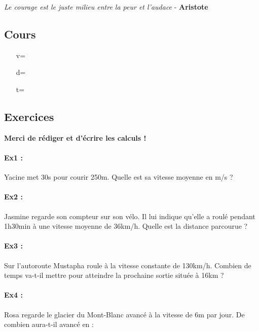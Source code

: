\begin{center}
  \textit{Le courage est le juste milieu entre la peur et l'audace}  - \textbf{Aristote}
\end{center}

\subsection*{Cours}

\begin{multicols}{3}
  \begin{enumerate}
  \item[v=] \dotfill 
  \item[d=] \dotfill
  \item[t=] \dotfill 
  \end{enumerate}
\end{multicols}

\subsection*{Exercices}
\textbf{Merci de rédiger et d'écrire les calculs !}

\paragraph{\textbf{Ex1 : }} Yacine met 30s pour courir 250m. Quelle est sa vitesse moyenne en m/s ?
\newline \Pointilles[5]

\paragraph{\textbf{Ex2 : }} Jasmine regarde son compteur sur son vélo. Il lui indique qu'elle a roulé pendant 1h30min à une vitesse moyenne de 36km/h. Quelle est la distance parcourue ?
\newline \Pointilles[5]

\paragraph{\textbf{Ex3 : }} Sur l'autoroute Mustapha roule à la vitesse constante de 130km/h. Combien de temps va-t-il mettre pour atteindre la prochaine sortie située à 16km ?
\newline \Pointilles[5]

\paragraph{\textbf{Ex4 : }} Rosa regarde le glacier du Mont-Blanc avancé à la vitesse de 6m par jour. De combien aura-t-il avancé en : 

